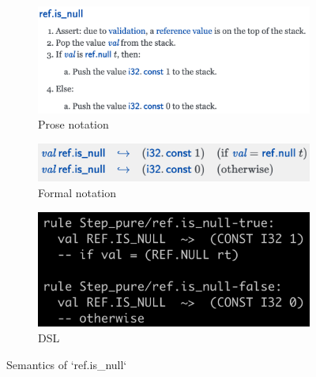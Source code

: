 \begin{figure}
  \centering
  \begin{subfigure}[b]{0.45\textwidth}
    \includegraphics[width=\textwidth]{../img/prosespec1}
    \caption{Prose notation}
    \label{fig:prosespec1}
  \end{subfigure}
  \hfill
  \begin{subfigure}[b]{0.45\textwidth}
    \includegraphics[width=\textwidth]{../img/formalspec1}
    \caption{Formal notation}
    \label{fig:formalspec1}
  \end{subfigure}
  \begin{subfigure}[b]{0.45\textwidth}
    \includegraphics[width=\textwidth]{../img/dsl1}
    \caption{DSL}
    \label{fig:dsl1}
  \end{subfigure}

  \caption{Semantics of `ref.is\_null`}
  \label{fig:spec1}
\end{figure}


